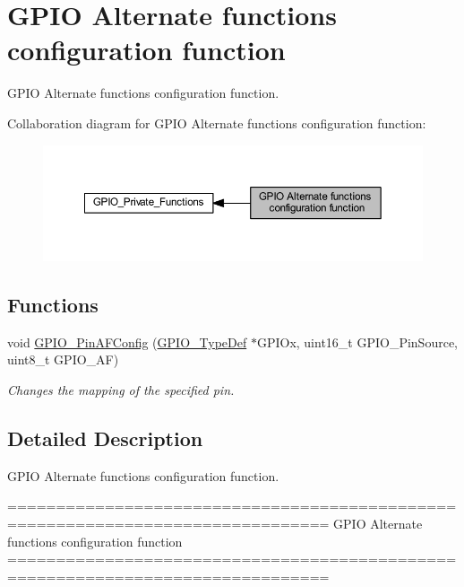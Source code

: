 \hypertarget{group___g_p_i_o___group3}{}\section{G\+P\+IO Alternate functions configuration function}
\label{group___g_p_i_o___group3}


G\+P\+IO Alternate functions configuration function.  


Collaboration diagram for G\+P\+IO Alternate functions configuration function\+:\nopagebreak
\begin{figure}[H]
\begin{center}
\leavevmode
\includegraphics[width=350pt]{group___g_p_i_o___group3}
\end{center}
\end{figure}
\subsection*{Functions}
\begin{DoxyCompactItemize}
\item 
void \hyperlink{group___g_p_i_o___group3_ga0a77617a322562ae84f8d72486032c5d}{G\+P\+I\+O\+\_\+\+Pin\+A\+F\+Config} (\hyperlink{struct_g_p_i_o___type_def}{G\+P\+I\+O\+\_\+\+Type\+Def} $\ast$G\+P\+I\+Ox, uint16\+\_\+t G\+P\+I\+O\+\_\+\+Pin\+Source, uint8\+\_\+t G\+P\+I\+O\+\_\+\+AF)
\begin{DoxyCompactList}\small\item\em Changes the mapping of the specified pin. \end{DoxyCompactList}\end{DoxyCompactItemize}


\subsection{Detailed Description}
G\+P\+IO Alternate functions configuration function. 

\begin{DoxyVerb} ===============================================================================
               GPIO Alternate functions configuration function
 ===============================================================================  \end{DoxyVerb}
 


